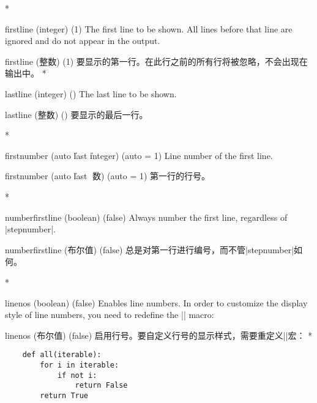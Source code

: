 \begin{optionlist}
\begin{paracol}{2}
\switchcolumn[0]*%
\item[firstline (integer) (1)]
The first line to be shown.
All lines before that line are ignored and do not appear in the output.
\switchcolumn
\item[firstline (整数) (1)]
要显示的第一行。在此行之前的所有行将被忽略，不会出现在输出中。
\switchcolumn[0]*%
\item[lastline (integer) (\meta{last line of input})]
The last line to be shown.
\switchcolumn
\item[lastline (整数) (\meta{输入的最后一行})]
要显示的最后一行。

\switchcolumn[0]*%
\item[firstnumber (auto \| last \| integer) (auto = 1)]
Line number of the first line.
\switchcolumn
\item[firstnumber (auto \| last \| 整数) (auto = 1)]
第一行的行号。

\switchcolumn[0]*%
\item[numberfirstline (boolean) (false)]
Always number the first line, regardless of |stepnumber|.
\switchcolumn
\item[numberfirstline (布尔值) (false)]
 总是对第一行进行编号，而不管|stepnumber|如何。


 \switchcolumn[0]*%
  \item[linenos (boolean) (false)]
    Enables line numbers.
    In order to customize the display style of line numbers, you need to redefine the |\theFancyVerbLine| macro:
    \switchcolumn
    \item[linenos (布尔值) (false)]
    启用行号。要自定义行号的显示样式，需要重定义|\theFancyVerbLine|宏：
    \switchcolumn[0]*%
\begin{example}
    \renewcommand{\theFancyVerbLine}{\sffamily
        \textcolor[rgb]{0.5,0.5,1.0}{\scriptsize
        \oldstylenums{\arabic{FancyVerbLine}}}}

    \begin{verbatim}
    def all(iterable):
        for i in iterable:
            if not i: 
                return False
        return True
    \end{verbatim}
\end{example}


\end{paracol}
\end{optionlist}
